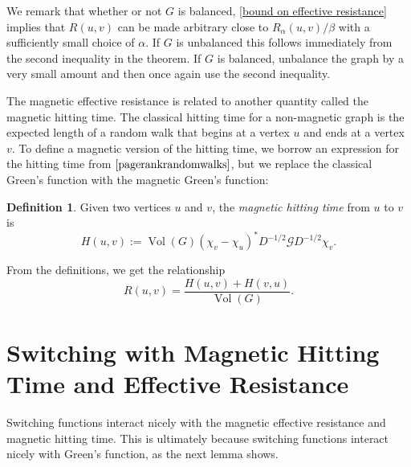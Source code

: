 \documentclass{article}
\theoremstyle{definition}
\newtheorem{defn}[thm]{Definition}
\DeclareMathOperator{\vol}{Vol}
\newcommand{\green}{\mathcal{G}}
\begin{document}
We remark that whether or not $G$ is balanced, \cref{bound on effective resistance} implies that $R(u, v)$ can be made arbitrary close to $R_\alpha (u, v) / \beta$ with a sufficiently small choice of $\alpha$. If $G$ is unbalanced this follows immediately from the second inequality in the theorem. If $G$ is balanced, unbalance the graph by a very small amount and then once again use the second inequality.

The magnetic effective resistance is related to another quantity called the magnetic hitting time. The classical hitting time for a non-magnetic graph is the expected length of a random walk that begins at a vertex $u$ and ends at a vertex $v$. To define a magnetic version of the hitting time, we borrow an expression for the hitting time from $\cite{pagerankrandomwalks}$, but we replace the classical Green's function with the magnetic Green's function:

\begin{defn}
Given two vertices $u$ and $v$, the \textit{magnetic hitting time} from $u$ to $v$ is 
$$
H(u, v) := \vol(G) (\chi_v - \chi_u)^* D^{-1/2} \green D^{-1/2} \chi_v.
$$  
\end{defn}

From the definitions, we get the relationship
$$R(u, v) = \frac{H(u, v) + H(v, u)}{\vol(G)}.$$

\section{Switching with Magnetic Hitting Time and Effective Resistance}

Switching functions interact nicely with the magnetic effective resistance and magnetic hitting time. This is ultimately because switching functions interact nicely with Green's function, as the next lemma shows.
\end{document}
